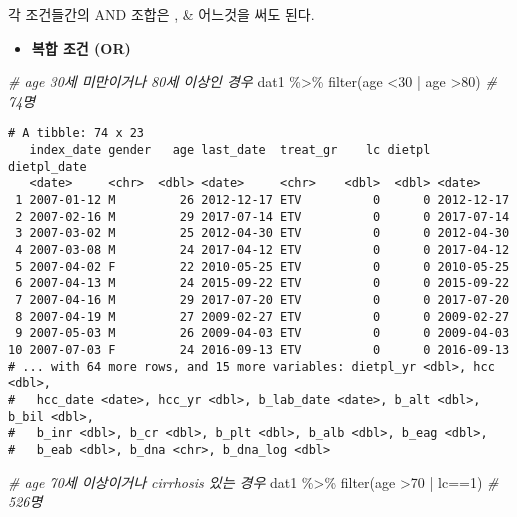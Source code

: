 \documentclass[
]{article}
\newenvironment{Shaded}{\begin{snugshade}}{\end{snugshade}}
\newcommand{\CommentTok}[1]{\textcolor[rgb]{0.56,0.35,0.01}{\textit{#1}}}
\newcommand{\DecValTok}[1]{\textcolor[rgb]{0.00,0.00,0.81}{#1}}
\newcommand{\FunctionTok}[1]{\textcolor[rgb]{0.00,0.00,0.00}{#1}}
\newcommand{\NormalTok}[1]{#1}
\newcommand{\SpecialCharTok}[1]{\textcolor[rgb]{0.00,0.00,0.00}{#1}}
\providecommand{\tightlist}{%
  \setlength{\itemsep}{0pt}\setlength{\parskip}{0pt}}
\begin{document}
각 조건들간의 AND 조합은 , \& 어느것을 써도 된다.

\begin{itemize}
\tightlist
\item
  \textbf{복합 조건 (OR)}
\end{itemize}

\begin{Shaded}
\begin{Highlighting}[]
\CommentTok{\# age 30세 미만이거나 80세 이상인 경우}
\NormalTok{dat1 }\SpecialCharTok{\%\textgreater{}\%} 
  \FunctionTok{filter}\NormalTok{(age }\SpecialCharTok{\textless{}}\DecValTok{30} \SpecialCharTok{|}\NormalTok{ age }\SpecialCharTok{\textgreater{}}\DecValTok{80}\NormalTok{) }\CommentTok{\# 74명}
\end{Highlighting}
\end{Shaded}

\begin{verbatim}
# A tibble: 74 x 23
   index_date gender   age last_date  treat_gr    lc dietpl dietpl_date
   <date>     <chr>  <dbl> <date>     <chr>    <dbl>  <dbl> <date>     
 1 2007-01-12 M         26 2012-12-17 ETV          0      0 2012-12-17 
 2 2007-02-16 M         29 2017-07-14 ETV          0      0 2017-07-14 
 3 2007-03-02 M         25 2012-04-30 ETV          0      0 2012-04-30 
 4 2007-03-08 M         24 2017-04-12 ETV          0      0 2017-04-12 
 5 2007-04-02 F         22 2010-05-25 ETV          0      0 2010-05-25 
 6 2007-04-13 M         24 2015-09-22 ETV          0      0 2015-09-22 
 7 2007-04-16 M         29 2017-07-20 ETV          0      0 2017-07-20 
 8 2007-04-19 M         27 2009-02-27 ETV          0      0 2009-02-27 
 9 2007-05-03 M         26 2009-04-03 ETV          0      0 2009-04-03 
10 2007-07-03 F         24 2016-09-13 ETV          0      0 2016-09-13 
# ... with 64 more rows, and 15 more variables: dietpl_yr <dbl>, hcc <dbl>,
#   hcc_date <date>, hcc_yr <dbl>, b_lab_date <date>, b_alt <dbl>, b_bil <dbl>,
#   b_inr <dbl>, b_cr <dbl>, b_plt <dbl>, b_alb <dbl>, b_eag <dbl>,
#   b_eab <dbl>, b_dna <chr>, b_dna_log <dbl>
\end{verbatim}

\begin{Shaded}
\begin{Highlighting}[]
\CommentTok{\# age 70세 이상이거나 cirrhosis 있는 경우}
\NormalTok{dat1 }\SpecialCharTok{\%\textgreater{}\%} 
  \FunctionTok{filter}\NormalTok{(age }\SpecialCharTok{\textgreater{}}\DecValTok{70} \SpecialCharTok{|}\NormalTok{ lc}\SpecialCharTok{==}\DecValTok{1}\NormalTok{) }\CommentTok{\# 526명}
\end{Highlighting}
\end{Shaded}
\end{document}
